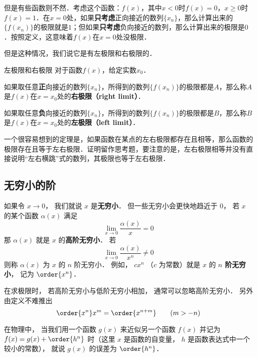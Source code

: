 但是有些函数则不然．考虑这个函数：$f(x)$，其中$x<0$时$f(x)=0$，$x\geq 0$时$f(x)=1$．在$x=0$处，如果\textbf{只考虑}正向接近的数列$\{x_n\}$，那么计算出来的$\{f(x_n)\}$的极限就是$1$；但如果\textbf{只考虑}负向接近的数列，那么计算出来的极限是$0$．按照定义，这意味着$f(x)$在$x=0$处没极限．

但是这种情况，我们说它是有左极限和右极限的．

\begin{definition}{左极限和右极限}
对于函数$f(x)$，给定实数$x_0$．

如果取任意\textbf{正}向接近的数列$\{x_n\}$，所得到的数列$\{f(x_n)\}$的极限都是$A$，那么称$A$是$f(x)$在$x=x_0$处的\textbf{右极限（right limit）}．

如果取任意\textbf{负}向接近的数列$\{x_n\}$，所得到的数列$\{f(x_n)\}$的极限都是$B$，那么称$B$是$f(x)$在$x=x_0$处的\textbf{左极限（left limit）}．
\end{definition}

一个很容易想到的定理是，如果函数在某点的左右极限都存在且相等，那么函数的极限存在且等于左右极限．证明留作思考题，要注意的是，左右极限相等并没有直接说明“左右横跳”式的数列，其极限也等于左右极限．





\subsection{无穷小的阶}
如果令 $x\to 0$， 我们就说 $x$ 是\textbf{无穷小}． 但一些无穷小会更快地趋近于 $0$， 若 $x$ 的某个函数 $\alpha(x)$ 满足
\begin{equation}
\lim_{x\to 0} \frac{\alpha(x)}{x} = 0
\end{equation}
那 $\alpha(x)$ 就是 $x$ 的\textbf{高阶无穷小}． 若
\begin{equation}
\lim_{x\to 0} \frac{\alpha(x)}{x^n} \ne 0
\end{equation}
则称 $\alpha(x)$ 为 $x$ 的 $n$ 阶无穷小． 例如， $c x^n$ （$c$ 为常数）就是 $x$ 的 \textbf{$n$ 阶无穷小}， 记为 $\order{x^n}$．

在求极限时， 若高阶无穷小与低阶无穷小相加， 通常可以忽略高阶无穷小． 另外由定义不难推出
\begin{equation}
\order{x^n} x^m = \order{x^{n + m}} \qquad (m > -n)
\end{equation}

在物理中， 当我们用一个函数 $g(x)$ 来近似另一个函数 $f(x)$ 并记为 $f(x) = g(x) + \order{h^n}$ 时（这里 $x$ 是函数的自变量， $h$ 是函数表达式中一个较小的常数）， 就说 $g(x)$ 的误差为 $\order{h^n}$．
